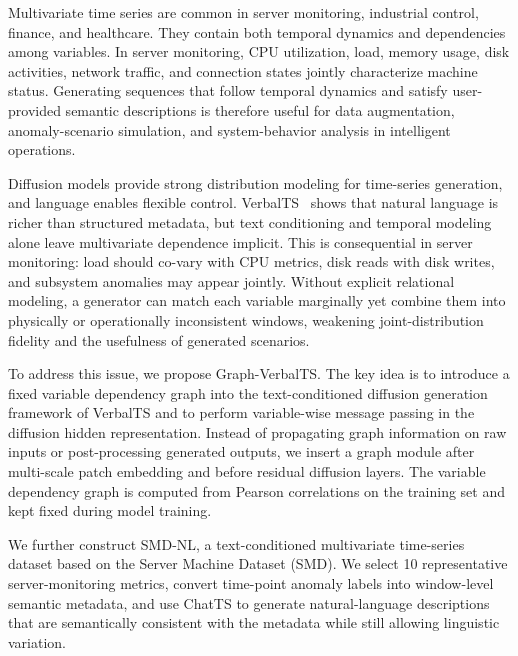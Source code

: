 \documentclass[conference]{IEEEtran}
\begin{document}
Multivariate time series are common in server monitoring, industrial control, finance, and healthcare. They contain both temporal dynamics and dependencies among variables. In server monitoring, CPU utilization, load, memory usage, disk activities, network traffic, and connection states jointly characterize machine status. Generating sequences that follow temporal dynamics and satisfy user-provided semantic descriptions is therefore useful for data augmentation, anomaly-scenario simulation, and system-behavior analysis in intelligent operations.

Diffusion models provide strong distribution modeling for time-series generation, and language enables flexible control. VerbalTS~\cite{gu2025verbalts} shows that natural language is richer than structured metadata, but text conditioning and temporal modeling alone leave multivariate dependence implicit. This is consequential in server monitoring: load should co-vary with CPU metrics, disk reads with disk writes, and subsystem anomalies may appear jointly. Without explicit relational modeling, a generator can match each variable marginally yet combine them into physically or operationally inconsistent windows, weakening joint-distribution fidelity and the usefulness of generated scenarios.

To address this issue, we propose Graph-VerbalTS. The key idea is to introduce a fixed variable dependency graph into the text-conditioned diffusion generation framework of VerbalTS and to perform variable-wise message passing in the diffusion hidden representation. Instead of propagating graph information on raw inputs or post-processing generated outputs, we insert a graph module after multi-scale patch embedding and before residual diffusion layers. The variable dependency graph is computed from Pearson correlations on the training set and kept fixed during model training.

We further construct SMD-NL, a text-conditioned multivariate time-series dataset based on the Server Machine Dataset (SMD). We select 10 representative server-monitoring metrics, convert time-point anomaly labels into window-level semantic metadata, and use ChatTS to generate natural-language descriptions that are semantically consistent with the metadata while still allowing linguistic variation.
\end{document}
